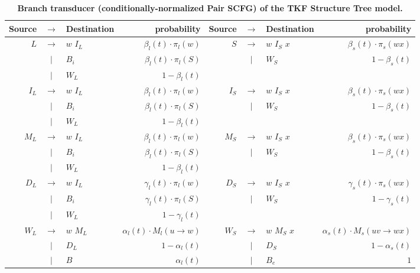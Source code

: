 \documentclass[10pt]{article}
\begin{document}
\begin{table}[!ht]
  \caption{
    \textbf{Branch transducer (conditionally-normalized Pair SCFG) of
      the TKF Structure Tree model.}}
  \begin{tabular}{|rcl|r||rcl|r|} \hline
    Source & $\rightarrow$ & Destination & probability & Source & $\rightarrow$ & Destination & probability \\ \hline
    $L$ & $\rightarrow$ & $w \,\, I_L$ & $\beta_l(t) \cdot \pi_l(w)$ & $S$ & $\rightarrow$ & $w \,\, I_S \,\, x$ & $\beta_s(t) \cdot \pi_s(wx)$ \\ \hline
    & $|$ & $B_i$ & $\beta_l(t) \cdot \pi_l(S)$ & & $|$ & $W_S$ & $1-\beta_s(t)$ \\ \hline
    & $|$ & $W_L$ & $1-\beta_l(t)$ & & & &  \\ \hline
    $I_L$ & $\rightarrow$ & $w \,\, I_L$ & $\beta_l(t) \cdot \pi_l(w)$ & $I_S$ & $\rightarrow$ & $w \,\, I_S \,\, x$ & $\beta_s(t) \cdot \pi_s(wx)$ \\ \hline
    & $|$ & $B_i$ & $\beta_l(t) \cdot \pi_l(S)$ & & $|$ & $W_S$ & $1-\beta_s(t)$ \\ \hline
    & $|$ & $W_L$ & $1-\beta_l(t)$ & & & & \\ \hline
    $M_L$ & $\rightarrow$ & $w \,\, I_L$ & $\beta_l(t) \cdot \pi_l(w)$ & $M_S$ & $\rightarrow$ & $w \,\, I_S \,\, x$ & $\beta_s(t) \cdot \pi_s(wx)$ \\ \hline
    & $|$ & $B_i$ & $\beta_l(t) \cdot \pi_l(S)$ & & $|$ & $W_S$ & $1-\beta_s(t)$ \\ \hline
    & $|$ & $W_L$ & $1-\beta_l(t)$ & & & &  \\ \hline
    $D_L$ & $\rightarrow$ & $w \,\, I_L$ & $\gamma_l(t) \cdot \pi_l(w)$ & $D_S$ & $\rightarrow$ & $w \,\, I_S \,\, x$ & $\gamma_s(t) \cdot \pi_s(wx)$ \\ \hline
    & $|$ & $B_i$ & $\gamma_l(t) \cdot \pi_l(S)$ & & $|$ & $W_S$ & $1-\gamma_s(t)$ \\ \hline
    & $|$ & $W_L$ & $1-\gamma_l(t)$ & & & &  \\ \hline
    $W_L$ & $\rightarrow$ & $w \,\, M_L$ & $\alpha_l(t) \cdot M_l(u \rightarrow w)$ & $W_S$ & $\rightarrow$ & $w \,\, M_S \,\, x$ & $\alpha_s(t) \cdot M_s(uv \rightarrow wx)$ \\ \hline
    & $|$ & $D_L$ & $1-\alpha_l(t)$ & & $|$ & $D_S$ & $1-\alpha_s(t)$ \\ \hline
    & $|$ & $B$ & $\alpha_l(t)$ & & $|$ & $B_e$ & $1$ \\ \hline

\end{tabular}
\end{table}
\end{document}
